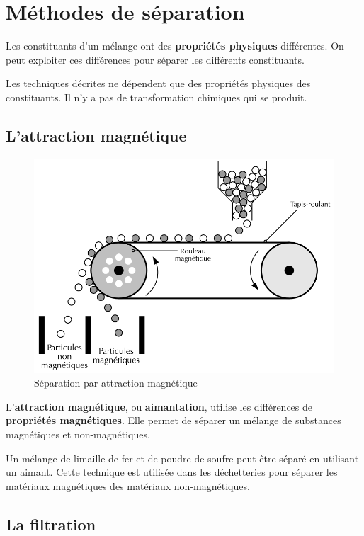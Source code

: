 \documentclass[
  11pt,
  a4paper,
  openany]{book}
\begin{document}
\newpage

\hypertarget{muxe9thodes-de-suxe9paration}{%
\section{Méthodes de séparation}\label{muxe9thodes-de-suxe9paration}}

Les constituants d'un mélange ont des \textbf{propriétés physiques} différentes. On peut exploiter ces différences pour séparer les différents constituants.

Les techniques décrites ne dépendent que des propriétés physiques des constituants. Il n'y a pas de transformation chimiques qui se produit.

\hypertarget{lattraction-magnuxe9tique}{%
\subsection{L'attraction magnétique}\label{lattraction-magnuxe9tique}}

\begin{figure}

{\centering \includegraphics[width=0.38\linewidth]{images/attraction-magnetique} 

}

\caption{Séparation par attraction magnétique}\label{fig:attraction-magnetique}
\end{figure}

L'\textbf{attraction magnétique}, ou \textbf{aimantation}, utilise les différences de \textbf{propriétés magnétiques}. Elle permet de séparer un mélange de substances magnétiques et non-magnétiques.

Un mélange de limaille de fer et de poudre de soufre peut être séparé en utilisant un aimant. Cette technique est utilisée dans les déchetteries pour séparer les matériaux magnétiques des matériaux non-magnétiques.

\hypertarget{la-filtration}{%
\subsection{La filtration}\label{la-filtration}}
\end{document}
